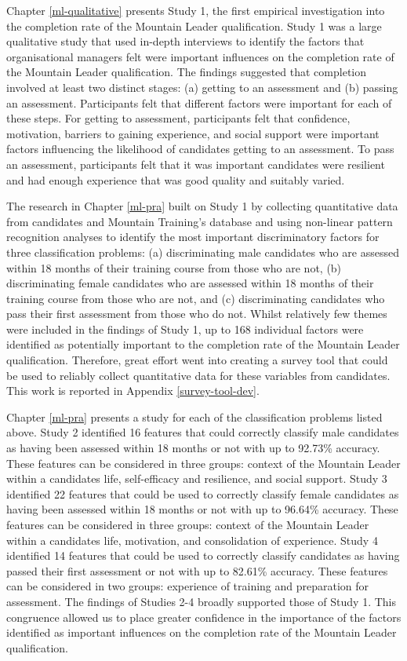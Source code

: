 \documentclass[
  12pt,
  a4paper,
]{book}
\begin{document}
Chapter \ref{ml-qualitative} presents Study 1, the first empirical investigation into the completion rate of the Mountain Leader qualification. Study 1 was a large qualitative study that used in-depth interviews to identify the factors that organisational managers felt were important influences on the completion rate of the Mountain Leader qualification. The findings suggested that completion involved at least two distinct stages: (a) getting to an assessment and (b) passing an assessment. Participants felt that different factors were important for each of these steps. For getting to assessment, participants felt that confidence, motivation, barriers to gaining experience, and social support were important factors influencing the likelihood of candidates getting to an assessment. To pass an assessment, participants felt that it was important candidates were resilient and had enough experience that was good quality and suitably varied.

The research in Chapter \ref{ml-pra} built on Study 1 by collecting quantitative data from candidates and Mountain Training's database and using non-linear pattern recognition analyses to identify the most important discriminatory factors for three classification problems: (a) discriminating male candidates who are assessed within 18 months of their training course from those who are not, (b) discriminating female candidates who are assessed within 18 months of their training course from those who are not, and (c) discriminating candidates who pass their first assessment from those who do not. Whilst relatively few themes were included in the findings of Study 1, up to 168 individual factors were identified as potentially important to the completion rate of the Mountain Leader qualification. Therefore, great effort went into creating a survey tool that could be used to reliably collect quantitative data for these variables from candidates. This work is reported in Appendix \ref{survey-tool-dev}.

Chapter \ref{ml-pra} presents a study for each of the classification problems listed above. Study 2 identified 16 features that could correctly classify male candidates as having been assessed within 18 months or not with up to 92.73\% accuracy. These features can be considered in three groups: context of the Mountain Leader within a candidates life, self-efficacy and resilience, and social support. Study 3 identified 22 features that could be used to correctly classify female candidates as having been assessed within 18 months or not with up to 96.64\% accuracy. These features can be considered in three groups: context of the Mountain Leader within a candidates life, motivation, and consolidation of experience. Study 4 identified 14 features that could be used to correctly classify candidates as having passed their first assessment or not with up to 82.61\% accuracy. These features can be considered in two groups: experience of training and preparation for assessment. The findings of Studies 2-4 broadly supported those of Study 1. This congruence allowed us to place greater confidence in the importance of the factors identified as important influences on the completion rate of the Mountain Leader qualification.
\end{document}
